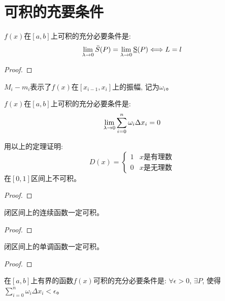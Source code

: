 
\section{可积的充要条件}
\begin{theorem}[可积的充要条件]
    $f(x)$在$[a, b]$上可积的充分必要条件是:
    \begin{equation*}
        \lim_{\lambda \to 0 } \bar{S}(P) = \lim_{\lambda \to 0 } \underbar{S}(P) \Longleftrightarrow L = l
    \end{equation*}
\end{theorem}
\begin{proof}

\end{proof}

$M_i-m_i$表示了$f(x)$在$[x_{i-1}, x_i]$上的振幅, 记为$\omega_i$。
\begin{theorem}
    $f(x)$在$[a, b]$上可积的充分必要条件是:
    \begin{equation*}
        \lim_{\lambda \to 0 } \sum_{i=0}^n\omega_i\Delta x_i = 0
    \end{equation*}
\end{theorem}

\begin{example}[Dirichlet函数]
    用以上的定理证明:
    \begin{equation*}
        D(x) = 
        \begin{cases}
            1 & x\text{是有理数} \\
            0 & x\text{是无理数}
        \end{cases}
    \end{equation*}
    在$[0, 1]$区间上不可积。
\end{example}
\begin{proof}
    
\end{proof}

\begin{lemma}
    闭区间上的连续函数一定可积。
\end{lemma}
\begin{proof}
    
\end{proof}

\begin{lemma}
    闭区间上的单调函数一定可积。
\end{lemma}
\begin{proof}
    
\end{proof}

\begin{theorem}
    在$[a, b]$上有界的函数$f(x)$可积的充分必要条件是: $\forall \epsilon > 0$, $\exists P$, 使得$\sum_{i=0}^n\omega_i \Delta x_i < \epsilon$。
\end{theorem}

